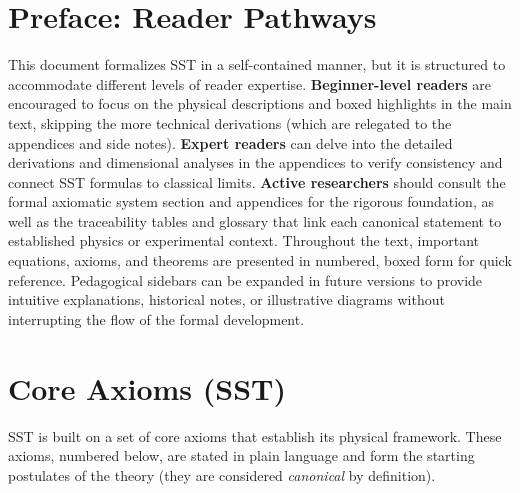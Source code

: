 \documentclass[reprint,aps,onecolumn,nofootinbib]{revtex4-2}
\begin{document}
\maketitle

\section*{Preface: Reader Pathways}
    This document formalizes SST in a self-contained manner, but it is structured to accommodate different levels of reader expertise. \textbf{Beginner-level readers} are encouraged to focus on the physical descriptions and boxed highlights in the main text, skipping the more technical derivations (which are relegated to the appendices and side notes). \textbf{Expert readers} can delve into the detailed derivations and dimensional analyses in the appendices to verify consistency and connect SST formulas to classical limits. \textbf{Active researchers} should consult the formal axiomatic system section and appendices for the rigorous foundation, as well as the traceability tables and glossary that link each canonical statement to established physics or experimental context. Throughout the text, important equations, axioms, and theorems are presented in numbered, boxed form for quick reference. Pedagogical sidebars can be expanded in future versions to provide intuitive explanations, historical notes, or illustrative diagrams without interrupting the flow of the formal development.


\section{Core Axioms (SST)}
    SST is built on a set of core axioms that establish its physical framework. These axioms, numbered below, are stated in plain language and form the starting postulates of the theory (they are considered \emph{canonical} by definition).
\end{document}
